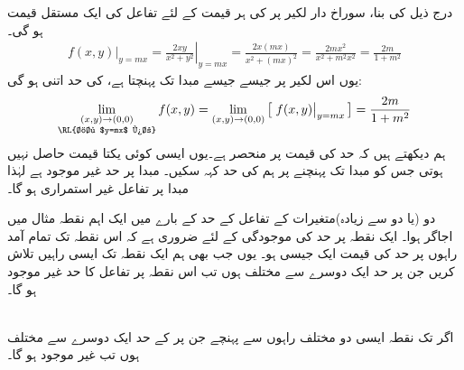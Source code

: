 درج ذیل کی بنا، سوراخ دار لکیر  پر  کی ہر قیمت کے لئے تفاعل  کی ایک مستقل قیمت  ہو گی۔
\begin{align*}
\left. f(x,y)\right\vert_{y=mx}=\left. \frac{2xy}{x^2+y^2}\right\vert_{y=mx}=\frac{2x(mx)}{x^2+(mx)^2}=\frac{2mx^2}{x^2+m^2x^2}=\frac{2m}{1+m^2}
\end{align*}
یوں  اس لکیر  پر جیسے جیسے    مبدا تک پہنچتا ہے،   کی حد اتنی ہو گی:
\begin{align*}
\lim_{\substack{(x,y)\to(0,0)\\ \text{\RL{خط $y=mx$ پر}}}} f(x,y)=\lim_{(x,y)\to(0,0)}\big[\left.f(x,y)\right\vert_{y=mx}\big]=\frac{2m}{1+m^2}
\end{align*}
ہم دیکھتے ہیں کہ حد کی قیمت  پر منحصر ہے۔یوں ایسی کوئی   یکتا قیمت حاصل نہیں ہوتی  جس کو    مبدا تک  پہنچنے   پر ہم    کی حد کہہ سکیں۔ مبدا پر حد غیر موجود ہے لہٰذا مبدا  پر تفاعل غیر استمراری ہو گا۔

دو  (یا دو سے زیادہ)متغیرات کے تفاعل کے حد کے بارے میں ایک اہم نقطہ مثال  میں  اجاگر ہوا۔ ایک نقطہ پر حد کی موجودگی کے لئے  ضروری ہے کہ اس نقطہ تک  تمام آمد    راہوں  پر  حد  کی قیمت ایک جیسی ہو۔  یوں جب بھی ہم ایک نقطہ  تک  ایسی راہیں  تلاش  کریں جن  پر حد ایک دوسرے سے  مختلف ہوں  تب  اس نقطہ پر تفاعل کا حد غیر موجود ہو گا۔

\\
اگر  تک نقطہ  ایسی دو مختلف راہوں سے پہنچے جن پر  کے حد ایک دوسرے سے مختلف ہوں تب  غیر موجود ہو گا۔

